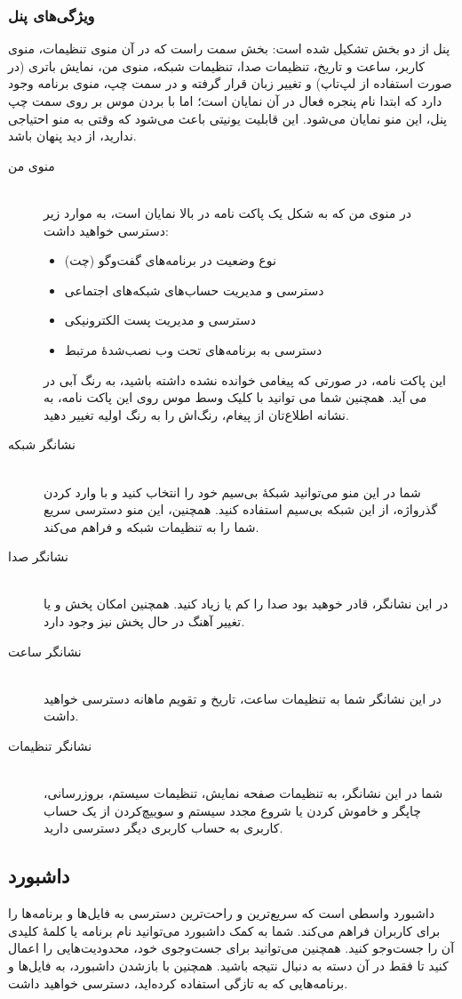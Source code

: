\subsubsection{ویژگی‌های پنل}
پنل از دو بخش تشکیل شده است: بخش سمت راست که در آن منوی تنظیمات، منوی کاربر، ساعت و تاریخ، تنظیمات صدا، تنظیمات شبکه، منوی من، نمایش باتری (در صورت استفاده از لپ‌تاپ) و تغییر زبان قرار گرفته و در سمت چپ، منوی برنامه وجود دارد که ابتدا نام پنجره فعال در آن نمایان است؛ اما با بردن موس بر روی سمت چپ پنل، این منو نمایان می‌شود. این قابلیت یونیتی باعث می‌شود که وقتی به منو احتیاجی ندارید، از دید پنهان باشد.
\begin{description}
\item[منوی من] \hfill \\
در منوی من که به شکل یک پاکت نامه در بالا نمایان است، به موارد زیر دسترسی خواهید داشت:
\begin{itemize}
\item نوع وضعیت در برنامه‌های گفت‌وگو (چت)
\item دسترسی و مدیریت حساب‌های شبکه‌های اجتماعی
\item دسترسی و مدیریت پست الکترونیکی
\item دسترسی به برنامه‌های تحت وب نصب‌شدهٔ مرتبط
\end{itemize}
این پاکت نامه، در صورتی که پیغامی خوانده نشده داشته باشید، به رنگ آبی در می آید. همچنین شما می توانید با کلیک وسط موس روی این پاکت نامه، به نشانه اطلاع‌تان از پیغام، رنگ‌اش را به رنگ اولیه تغییر دهید.
\item[نشانگر شبکه] \hfill \\
شما در این منو می‌توانید شبکهٔ بی‌سیم خود را انتخاب کنید و با وارد کردن گذرواژه، از این شبکه بی‌سیم استفاده کنید. همچنین، این منو دسترسی سریع شما را به تنظیمات شبکه و  فراهم می‌کند.
\item[نشانگر صدا] \hfill \\
در این نشانگر، قادر خوهید بود صدا را کم یا زیاد کنید. همچنین امکان پخش و یا تغییر آهنگ در حال پخش نیز وجود دارد.
\item[نشانگر ساعت] \hfill \\
در این نشانگر شما به تنظیمات ساعت، تاریخ و تقویم ماهانه دسترسی خواهید داشت.
\item[نشانگر تنظیمات] \hfill \\
شما در این نشانگر، به تنظیمات صفحه نمایش، تنظیمات سیستم، بروزرسانی، چاپگر و خاموش کردن یا شروع مجدد سیستم و سوییچ‌کردن از یک حساب کاربری به حساب کاربری دیگر دسترسی دارید.
\end{description}

\subsection{داشبورد}
داشبورد واسطی است که سریع‌ترین و راحت‌ترین دسترسی به فایل‌ها و برنامه‌ها را برای کاربران فراهم می‌کند. شما به کمک داشبورد می‌توانید نام برنامه یا کلمهٔ کلیدی آن را جست‌وجو کنید. همچنین می‌توانید برای جست‌وجوی خود، محدودیت‌هایی را اعمال کنید تا فقط در آن دسته به دنبال نتیجه باشید. همچنین با بازشدن داشبورد، به فایل‌ها و برنامه‌هایی که به تازگی استفاده کرده‌اید، دسترسی خواهید داشت.

